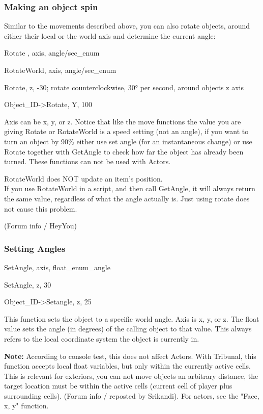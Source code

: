 \documentclass[
]{article}
\begin{document}
\hypertarget{making-an-object-spin}{%
\subsubsection{Making an object spin}\label{making-an-object-spin}}

Similar to the movements described above, you can also rotate objects,
around either their local or the world axis and determine the current
angle:

Rotate , axis, angle/sec\_enum

RotateWorld, axis, angle/sec\_enum

Rotate, z, -30; rotate counterclockwise, 30° per second, around objects
z axis

Object\_ID-\textgreater Rotate, Y, 100

Axis can be x, y, or z. Notice that like the move functions the value
you are giving Rotate or RotateWorld is a speed setting (not an angle),
if you want to turn an object by 90\% either use set angle (for an
instantaneous change) or use Rotate together with GetAngle to check how
far the object has already been turned. These functions can not be used
with Actors.

RotateWorld does NOT update an item's position.\\
If you use RotateWorld in a script, and then call GetAngle, it will
always return the same value, regardless of what the angle actually is.
Just using rotate does not cause this problem.

(Forum info / HeyYou)

\hypertarget{setting-angles}{%
\subsubsection{\texorpdfstring{Setting Angles
}{Setting Angles }}\label{setting-angles}}

SetAngle, axis, float\_enum\_angle

SetAngle, z, 30

Object\_ID-\textgreater Setangle, z, 25

This function sets the object to a specific world angle. Axis is x, y,
or z. The float value sets the angle (in degrees) of the calling object
to that value. This always refers to the local coordinate system the
object is currently in.

\textbf{Note:} According to console test, this does not affect Actors.
With Tribunal, this function accepts local float variables, but only
within the currently active cells. This is relevant for exteriors, you
can not move objects an arbitrary distance, the target location must be
within the active cells (current cell of player plus surrounding cells).
(Forum info / reposted by Srikandi). For actors, see the "Face, x, y"
function.
\end{document}
